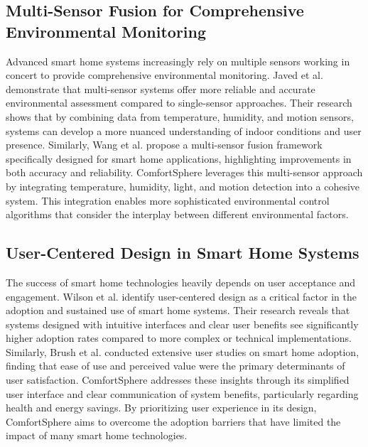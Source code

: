 \documentclass[a4paper]{scrartcl}
\begin{document}
    \subsection{Multi-Sensor Fusion for Comprehensive Environmental Monitoring}
    Advanced smart home systems increasingly rely on multiple sensors working in concert to provide comprehensive environmental monitoring. Javed et al. \cite{paper9} demonstrate that multi-sensor systems offer more reliable and accurate environmental assessment compared to single-sensor approaches. Their research shows that by combining data from temperature, humidity, and motion sensors, systems can develop a more nuanced understanding of indoor conditions and user presence. Similarly, Wang et al. \cite{paper10} propose a multi-sensor fusion framework specifically designed for smart home applications, highlighting improvements in both accuracy and reliability. ComfortSphere leverages this multi-sensor approach by integrating temperature, humidity, light, and motion detection into a cohesive system. This integration enables more sophisticated environmental control algorithms that consider the interplay between different environmental factors.

    \subsection{User-Centered Design in Smart Home Systems}
    The success of smart home technologies heavily depends on user acceptance and engagement. Wilson et al. \cite{paper11} identify user-centered design as a critical factor in the adoption and sustained use of smart home systems. Their research reveals that systems designed with intuitive interfaces and clear user benefits see significantly higher adoption rates compared to more complex or technical implementations. Similarly, Brush et al. \cite{paper12} conducted extensive user studies on smart home adoption, finding that ease of use and perceived value were the primary determinants of user satisfaction. ComfortSphere addresses these insights through its simplified user interface and clear communication of system benefits, particularly regarding health and energy savings. By prioritizing user experience in its design, ComfortSphere aims to overcome the adoption barriers that have limited the impact of many smart home technologies.
\end{document}
